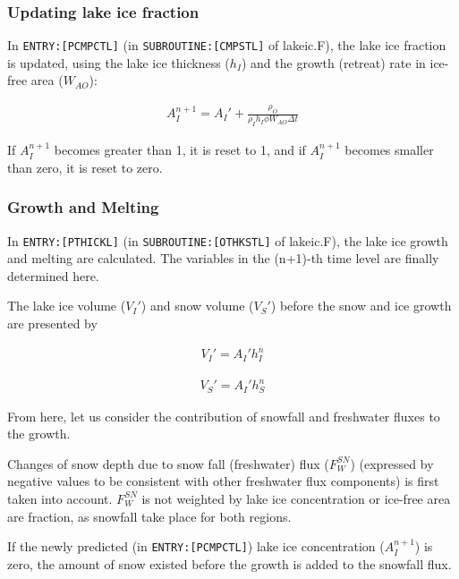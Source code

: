 \hypertarget{updating-lake-ice-fraction}{%
\subsubsection{Updating lake ice
fraction}\label{updating-lake-ice-fraction}}

In \texttt{ENTRY:{[}PCMPCTL{]}} (in \texttt{SUBROUTINE:{[}CMPSTL{]}} of
lakeic.F), the lake ice fraction is updated, using the lake ice
thickness (\(h_I\)) and the growth (retreat) rate in ice-free area
(\(W_{AO}\)):

\begin{eqnarray}
    {A_I^{n+1}} = {A_I'} +\frac{\rho_O }{\rho_I h_I \phi W_{AO}\Delta t}
\end{eqnarray}

If \(A_I^{n+1}\) becomes greater than 1, it is reset to 1, and if
\(A_I^{n+1}\) becomes smaller than zero, it is reset to zero.

\hypertarget{growth-and-melting}{%
\subsubsection{Growth and Melting}\label{growth-and-melting}}

In \texttt{ENTRY:{[}PTHICKL{]}} (in \texttt{SUBROUTINE:{[}OTHKSTL{]}} of
lakeic.F), the lake ice growth and melting are calculated. The variables
in the (n+1)-th time level are finally determined here.

The lake ice volume (\(V_I'\)) and snow volume (\(V_S'\)) before the
snow and ice growth are presented by

\begin{eqnarray}
    V_I' = A_I' h_I^n
\end{eqnarray}

\begin{eqnarray}
    V_S' = A_I' h_S^n
\end{eqnarray}

From here, let us consider the contribution of snowfall and freshwater
fluxes to the growth.

Changes of snow depth due to snow fall (freshwater) flux (\(F_W^{SN}\))
(expressed by negative values to be consistent with other freshwater
flux components) is first taken into account. \(F_W^{SN}\) is not
weighted by lake ice concentration or ice-free area are fraction, as
snowfall take place for both regions.

If the newly predicted (in \texttt{ENTRY:{[}PCMPCTL{]}}) lake ice
concentration (\(A_I^{n+1}\)) is zero, the amount of snow existed before
the growth is added to the snowfall flux.

